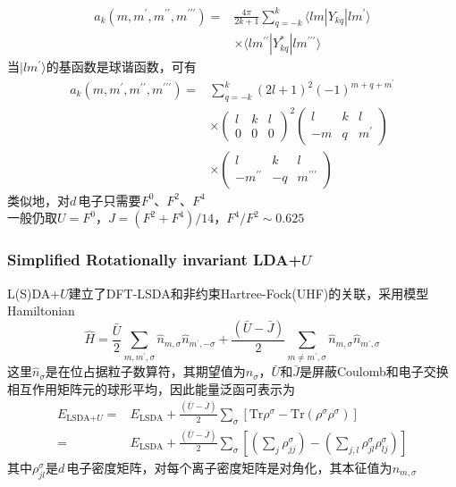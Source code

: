 {\frame
{
	\begin{displaymath}
		\begin{aligned}
			a_k(m,m^{\prime},m^{\prime\prime},m^{\prime\prime\prime})=&\frac{4\pi}{2k+1}\sum_{q=-k}^k\langle lm|Y_{kq}|lm^{\prime}\rangle\\
			&\times\langle lm^{\prime\prime}|Y_{kq}^{\ast}|lm^{\prime\prime\prime}\rangle
		\end{aligned}
	\end{displaymath}
	当$|lm^{\prime}\rangle$的基函数是球谐函数，可有
	\begin{displaymath}
		\begin{aligned}
			a_k(m,m^{\prime},m^{\prime\prime},m^{\prime\prime\prime})=&\sum_{q=-k}^k(2l+1)^2(-1)^{m+q+m^{\prime}}\\
			&\times\left(
			\begin{matrix}
				l &k &l\\
				0 &0 &0
			\end{matrix}
			\right)^2\left(
			\begin{matrix}
				l &k &l\\
				-m &q &m^{\prime}
			\end{matrix}\right)\\
			&\times\left(
			\begin{matrix}
				l &k &l\\
				-m^{\prime\prime} &-q &m^{\prime\prime\prime}
			\end{matrix}\right)
		\end{aligned}
	\end{displaymath}
类似地，对$d$\,电子只需要$F^0$、$F^2$、$F^4$\\一般仍取$U=F^0$，$J=(F^2+F^4)/14$，$F^4/F^2\sim 0.625$
}

\frame
{
	\frametitle{\textrm{Simplified Rotationally invariant LDA+}$U$}
	\textrm{L(S)DA}+$U$建立了\textrm{DFT-LSDA}和非约束\textrm{Hartree-Fock(UHF)}的关联，采用模型\textrm{Hamiltonian}
\begin{displaymath}
	\hat H=\frac{\bar U}2\sum_{m,m^{\prime},\sigma}\hat n_{m,\sigma}\hat n_{m^{\prime},-\sigma}+\frac{(\bar U-\bar J)}2\sum_{m\neq m^{\prime},\sigma}\hat n_{m,\sigma}\hat n_{m^{\prime},\sigma}
\end{displaymath}
这里$\hat n_{\sigma}$是在位占据粒子数算符，其期望值为$n_{\sigma}$，$\bar U$和$\bar J$是屏蔽\textrm{Coulomb}和电子交换相互作用矩阵元的球形平均，因此能量泛函可表示为
	\begin{displaymath}
		\begin{aligned}
			E_{\textrm{LSDA+}U}=&E_{\textrm{LSDA}}+\frac{(\bar U-\bar J)}2\sum_{\sigma}\left[\mathrm{Tr}\rho^{\sigma}-\mathrm{Tr}(\rho^{\sigma}\rho^{\sigma})\right]\\
			=&E_{\textrm{LSDA}}+\frac{(\bar U-\bar J)}2\sum_{\sigma}\left[\left(\sum_j\rho_{jj}^{\sigma}\right)-\left(\sum_{j,l}\rho_{jl}^{\sigma}\rho_{lj}^{\sigma}\right)\right]
		\end{aligned}
	\end{displaymath}
	其中$\rho_{jl}^{\sigma}$是$d$\,电子密度矩阵，对每个离子密度矩阵是对角化，其本征值为$n_{m,\sigma}$
}

}
